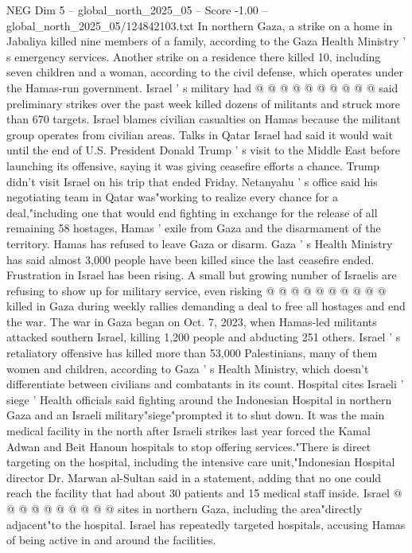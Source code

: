 \begin{textsample}{NEG Dim 5 – global\_north\_2025\_05 – Score -1.00 – global\_north\_2025\_05/124842103.txt}
In northern Gaza, a strike on a home in Jabaliya killed nine members of a family, according to the Gaza Health Ministry ' s emergency services.
Another strike on a residence there killed 10, including seven children and a woman, according to the civil defense, which operates under the Hamas-run government.
Israel ' s military had @ @ @ @ @ @ @ @ @ @ said preliminary strikes over the past week killed dozens of militants and struck more than 670 targets.
Israel blames civilian casualties on Hamas because the militant group operates from civilian areas.
Talks in Qatar Israel had said it would wait until the end of U.S.
President Donald Trump ' s visit to the Middle East before launching its offensive, saying it was giving ceasefire efforts a chance.
Trump didn't visit Israel on his trip that ended Friday.
Netanyahu ' s office said his negotiating team in Qatar was"working to realize every chance for a deal,"including one that would end fighting in exchange for the release of all remaining 58 hostages, Hamas ' exile from Gaza and the disarmament of the territory.
Hamas has refused to leave Gaza or disarm.
Gaza ' s Health Ministry has said almost 3,000 people have been killed since the last ceasefire ended.
Frustration in Israel has been rising.
A small but growing number of Israelis are refusing to show up for military service, even risking @ @ @ @ @ @ @ @ @ @ killed in Gaza during weekly rallies demanding a deal to free all hostages and end the war.
The war in Gaza began on Oct. 7, 2023, when Hamas-led militants attacked southern Israel, killing 1,200 people and abducting 251 others.
Israel ' s retaliatory offensive has killed more than 53,000 Palestinians, many of them women and children, according to Gaza ' s Health Ministry, which doesn't differentiate between civilians and combatants in its count.
Hospital cites Israeli ' siege ' Health officials said fighting around the Indonesian Hospital in northern Gaza and an Israeli military"siege"prompted it to shut down.
It was the main medical facility in the north after Israeli strikes last year forced the Kamal Adwan and Beit Hanoun hospitals to stop offering services."There is direct targeting on the hospital, including the intensive care unit,"Indonesian Hospital director Dr.
Marwan al-Sultan said in a statement, adding that no one could reach the facility that had about 30 patients and 15 medical staff inside.
Israel @ @ @ @ @ @ @ @ @ @ sites in northern Gaza, including the area"directly adjacent"to the hospital.
Israel has repeatedly targeted hospitals, accusing Hamas of being active in and around the facilities.

\end{textsample}
